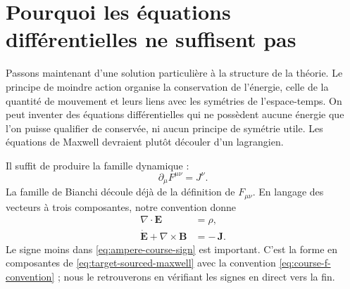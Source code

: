 \begin{classroomqa}
\end{classroomqa}

\begin{classroomqa}
\end{classroomqa}

\section{Pourquoi les équations différentielles ne suffisent pas}

Passons maintenant d’une solution particulière à la structure de la théorie. Le principe de moindre action organise la conservation de l’énergie, celle de la quantité de mouvement et leurs liens avec les symétries de l’espace-temps. On peut inventer des équations différentielles qui ne possèdent aucune énergie que l’on puisse qualifier de conservée, ni aucun principe de symétrie utile. Les équations de Maxwell devraient plutôt découler d’un lagrangien.

Il suffit de produire la famille dynamique :
\begin{equation}
\partial_\mu F^{\mu\nu}=J^\nu.
\label{eq:target-sourced-maxwell}
\end{equation}
La famille de Bianchi découle déjà de la définition de \(F_{\mu\nu}\). En langage des vecteurs à trois composantes, notre convention donne
\begin{align}
\nabla\cdot\mathbf E&=\rho,
\label{eq:gauss-source}
\\
\dot{\mathbf E}+\nabla\times\mathbf B&=-\,\mathbf J.
\label{eq:ampere-course-sign}
\end{align}
Le signe moins dans \eqref{eq:ampere-course-sign} est important. C’est la forme en composantes de \eqref{eq:target-sourced-maxwell} avec la convention \eqref{eq:course-f-convention} ; nous le retrouverons en vérifiant les signes en direct vers la fin.

